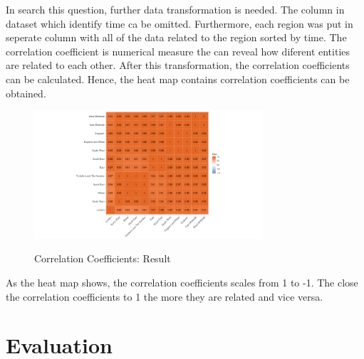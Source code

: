 \documentclass{article}
\begin{document}
In search this question, further data transformation is needed. The column in dataset which identify time 
ca be omitted. Furthermore, each region was put in seperate column with all of the data related to the region 
sorted by time. The correlation coefficient is numerical measure the can reveal how diferent entities are 
related to each other. After this transformation, the correlation coefficients can be calculated. Hence, 
the heat map contains correlation coefficients can be obtained.

\begin{figure}[htb]
  \begin{minipage}[b]{1.0\linewidth}
    \centering
    \centerline{\includegraphics[width=8.5cm]{corHeatMap}}
    \centerline{Correlation Coefficients: Result}\medskip
  \end{minipage}
\end{figure}

As the heat map shows, the correlation coefficients scales from 1 to -1. The close the correlation coefficients 
to 1 the more they are related and vice versa.



\section{Evaluation}



\vfill\pagebreak
\printbibliography
\end{document}
